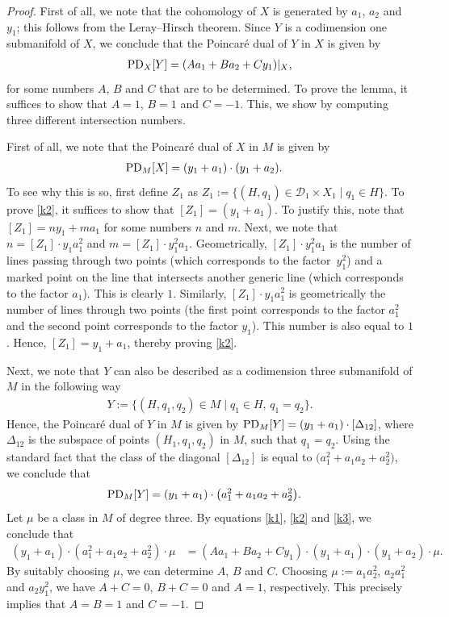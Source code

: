 \begin{proof} First of all, we note that the cohomology of $X$
is generated by $a_1$, $a_2$ and $y_1$; this follows from the Leray--Hirsch theorem.
Since $Y$ is a codimension one submanifold of $X$, we conclude that the
Poincar\'{e} dual of $Y$ in $X$ is given by
\begin{align}
\textnormal{PD}_{X}[Y] = (A a_1 + B a_2 + C y_1)|_{X}, \label{k1}
\end{align}
for some numbers $A$, $B$ and $C$ that are to be determined.
To prove the lemma, it suffices to show that $A = 1$, $ B = 1$ and $C = -1$.
This, we show by computing three different intersection numbers.

First of all, we note that the Poincar\'{e} dual of $X$ in $M$ is given by
\begin{align}
\textnormal{PD}_{M}[X]& = (y_1+a_1)\cdot(y_1+a_2). \label{k2}
\end{align}
To see why this is so, first define $Z_1$ as
$
Z_1 := \{ (H, q_1) \in \mathcal{D}_1 \times X_1  \mid  q_1 \in H\}$.
To prove \eqref{k2}, it suffices to show that $[Z_1] = (y_1 + a_1)$.
To justify this, note that
$[Z_1] = n y_1 + m a_1$ for some numbers $n$ and $m$. Next, we note that
$n = [Z_1]\cdot y_1 a_1^2$ and $m = [Z_1]\cdot y_1^2 a_1$.
Geometrically, $[Z_1]\cdot y_1^2 a_1$ is the number of lines passing through
two points \big(which corresponds to the factor~$y_1^2$\big) and a marked point on the line
that intersects another generic line (which corresponds to the factor $a_1$). This is
clearly $1$. Similarly, $[Z_1]\cdot y_1 a_1^2$ is geometrically the number of lines
through two points (the first point corresponds to the factor $a_1^2$ and the second point
corresponds to the factor $y_1$). This number is also equal to $1$. Hence,
$[Z_1]= y_1 + a_1$, thereby proving \eqref{k2}.

Next, we note that $Y$ can also be described as a codimension three submanifold of $M$
in the following way
\begin{align*}
Y:= \{ (H, q_1, q_2) \in M\mid q_1 \in H,\,  q_1 = q_2\}.
\end{align*}
Hence, the Poincar\'{e} dual of $Y$ in $M$ is given by
$
\textnormal{PD}_{M}[Y] = (y_1+a_1)\cdot [\Delta_{12}]$,
where $\Delta_{12}$ is the subspace of points $(H_1, q_1, q_2)$ in $M$, such that
$q_1 = q_2$.
Using the standard fact that the class of the diagonal
$[\Delta_{12}]$ is equal to $\big(a_1^2 + a_1 a_2 + a_2^2\big)$,
we conclude that
\begin{align}
\textnormal{PD}_{M}[Y]& = (y_1+a_1)\cdot \big(a_1^2 + a_1 a_2 + a_2^2\big). \label{k3}
\end{align}
Let $\mu$ be a class in $M$ of degree three. By equations \eqref{k1}, \eqref{k2} and \eqref{k3},
we conclude that
\begin{align*}
(y_1+a_1)\cdot (a_1^2 + a_1 a_2 + a_2^2) \cdot \mu & = (A a_1 + B a_2 + C y_1)\cdot (y_1+a_1)\cdot(y_1+a_2) \cdot \mu.
\end{align*}
By suitably choosing $\mu$, we can determine $A$, $B$ and $C$.
Choosing $\mu := a_1 a_2^2$, $a_2a_1^2$ and $a_2 y_1^2$, we have
$A+C = 0$, $B+C = 0$ and $A = 1$, respectively. This precisely implies that
$A = B = 1$ and $C = -1$.
\end{proof}

